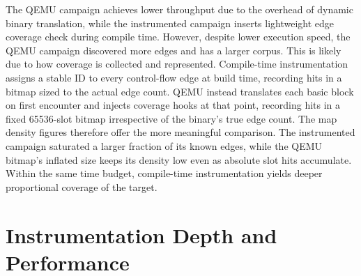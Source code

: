 \documentclass[letterpaper,twocolumn,10pt]{article}
\begin{document}
The QEMU campaign achieves lower throughput due to the overhead of dynamic binary translation, while the instrumented campaign inserts lightweight edge coverage check during compile time. However, despite lower execution speed, the QEMU campaign discovered more edges and has a larger corpus. This is likely due to how coverage is collected and represented. Compile-time instrumentation assigns a stable ID to every control-flow edge at build time, recording hits in a bitmap sized to the actual edge count. QEMU instead translates each basic block on first encounter and injects coverage hooks at that point, recording hits in a fixed 65536-slot bitmap irrespective of the binary's true edge count. The map density figures therefore offer the more meaningful comparison. The instrumented campaign saturated a larger fraction of its known edges, while the QEMU bitmap's inflated size keeps its density low even as absolute slot hits accumulate. Within the same time budget, compile-time instrumentation yields deeper proportional coverage of the target.






\section{Instrumentation Depth and Performance}
\label{sec:q8}

\end{document}
